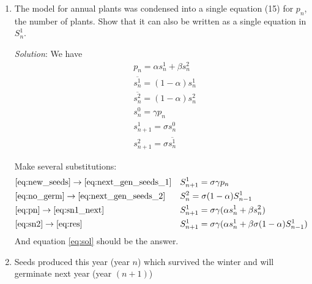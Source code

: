 \begin{homeworkProblem}
    \begin{enumerate}
        \item The model for annual plants was condensed into a single equation (15)
        for $p_n$, the number of plants. Show that it can also be written as a
        single equation in $S_n^1$.
    
        \textit{Solution}: We have \begin{align}
            &p_n = \alpha s_n^1 + \beta s_n^2 \label{eq:pn} \\
            &\overline{s_n^1} = (1-\alpha)s_n^1 \label{eq:no_germ}\\
            &\overline{s_n^2} = (1-\alpha)s_n^2\\
            &s_n^0=\gamma p_n \label{eq:new_seeds}\\
            &s_{n+1}^1 = \sigma s_n^0 \label{eq:next_gen_seeds_1}\\
            &s_{n+1}^2 = \sigma \overline{s_n^1} \label{eq:next_gen_seeds_2}
        \end{align}
    
        Make several substitutions:
        \begin{align}
            &\eqref{eq:new_seeds} \rightarrow \eqref{eq:next_gen_seeds_1}
            & & S_{n+1}^1 = \sigma \gamma p_n \label{eq:sn1_next} \\
            &\eqref{eq:no_germ} \rightarrow \eqref{eq:next_gen_seeds_2}
            & & S_{n}^2 = \sigma (1-\alpha) S_{n-1}^1 \label{eq:sn2}\\
            &\eqref{eq:pn} \rightarrow \eqref{eq:sn1_next}
            & & S_{n+1}^1 = \sigma \gamma (\alpha s_n^1 + \beta s_n^2)
            \label{eq:res}\\
            &\eqref{eq:sn2} \rightarrow \eqref{eq:res}
            & & S_{n+1}^1 = \sigma \gamma (\alpha s_n^1 +
            \beta \sigma (1-\alpha) S_{n-1}^1) \label{eq:sol}
        \end{align}
        And equation \eqref{eq:sol} should be the answer.
        \item Seeds produced this year (year $n$) which survived the winter and will
        germinate next year (year $(n+1)$)
    

\end{enumerate}
\end{homeworkProblem}
